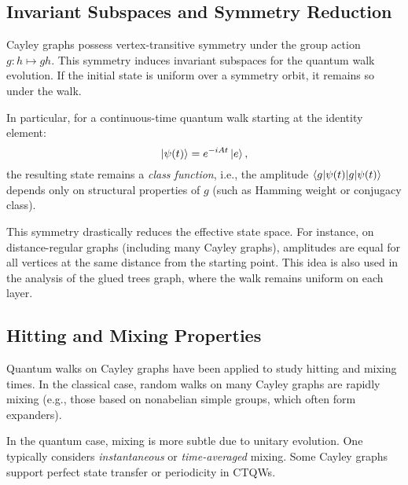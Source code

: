 \documentclass[12pt]{report}
\begin{document}



\subsection{Invariant Subspaces and Symmetry Reduction}

Cayley graphs possess vertex-transitive symmetry under the group action $g : h \mapsto gh$. This symmetry induces invariant subspaces for the quantum walk evolution. If the initial state is uniform over a symmetry orbit, it remains so under the walk.

In particular, for a continuous-time quantum walk starting at the identity element:
\[
\ket{\psi(t)} = e^{-iAt} \ket{e},
\]
the resulting state remains a \emph{class function}, i.e., the amplitude $\braket{g|\psi(t)}$ depends only on structural properties of $g$ (such as Hamming weight or conjugacy class).

This symmetry drastically reduces the effective state space. For instance, on distance-regular graphs (including many Cayley graphs), amplitudes are equal for all vertices at the same distance from the starting point. This idea is also used in the analysis of the glued trees graph, where the walk remains uniform on each layer.

\subsection{Hitting and Mixing Properties}

Quantum walks on Cayley graphs have been applied to study hitting and mixing times. In the classical case, random walks on many Cayley graphs are rapidly mixing (e.g., those based on nonabelian simple groups, which often form expanders).

In the quantum case, mixing is more subtle due to unitary evolution. One typically considers \emph{instantaneous} or \emph{time-averaged} mixing. Some Cayley graphs support perfect state transfer or periodicity in CTQWs.
\end{document}
